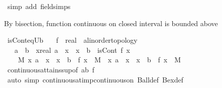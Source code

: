 \begin{isabellebody}
\ {\isacharparenleft}{\kern0pt}simp\ add{\isacharcolon}{\kern0pt}\ field{\isacharunderscore}{\kern0pt}simps{\isacharparenright}{\kern0pt}%
\endisatagproof
{\isafoldproof}%
%
\isadelimproof
%
\endisadelimproof
%
\isadelimdocument
%
\endisadelimdocument
%
\isatagdocument
%
\isamarkuptrue%
%
\endisatagdocument
{\isafolddocument}%
%
\isadelimdocument
%
\endisadelimdocument
%
\begin{isamarkuptext}%
By bisection, function continuous on closed interval is bounded above%
\end{isamarkuptext}\isamarkuptrue%
\isamarkupfalse%
\ isCont{\isacharunderscore}{\kern0pt}eq{\isacharunderscore}{\kern0pt}Ub{\isacharcolon}{\kern0pt}\isanewline
\ \ \ f\ {\isacharcolon}{\kern0pt}{\isacharcolon}{\kern0pt}\ {\isachardoublequoteopen}real\ {\isasymRightarrow}\ {\isacharprime}{\kern0pt}a{\isacharcolon}{\kern0pt}{\isacharcolon}{\kern0pt}linorder{\isacharunderscore}{\kern0pt}topology{\isachardoublequoteclose}\isanewline
\ \ \ {\isachardoublequoteopen}a\ {\isasymle}\ b\ {\isasymLongrightarrow}\ {\isasymforall}x{\isacharcolon}{\kern0pt}{\isacharcolon}{\kern0pt}real{\isachardot}{\kern0pt}\ a\ {\isasymle}\ x\ {\isasymand}\ x\ {\isasymle}\ b\ {\isasymlongrightarrow}\ isCont\ f\ x\ {\isasymLongrightarrow}\isanewline
\ \ \ \ {\isasymexists}M{\isachardot}{\kern0pt}\ {\isacharparenleft}{\kern0pt}{\isasymforall}x{\isachardot}{\kern0pt}\ a\ {\isasymle}\ x\ {\isasymand}\ x\ {\isasymle}\ b\ {\isasymlongrightarrow}\ f\ x\ {\isasymle}\ M{\isacharparenright}{\kern0pt}\ {\isasymand}\ {\isacharparenleft}{\kern0pt}{\isasymexists}x{\isachardot}{\kern0pt}\ a\ {\isasymle}\ x\ {\isasymand}\ x\ {\isasymle}\ b\ {\isasymand}\ f\ x\ {\isacharequal}{\kern0pt}\ M{\isacharparenright}{\kern0pt}{\isachardoublequoteclose}\isanewline
%
\isadelimproof
\ \ %
\endisadelimproof
%
\isatagproof
{}\isamarkupfalse%
\ continuous{\isacharunderscore}{\kern0pt}attains{\isacharunderscore}{\kern0pt}sup{\isacharbrackleft}{\kern0pt}of\ {\isachardoublequoteopen}{\isacharbraceleft}{\kern0pt}a{\isachardot}{\kern0pt}{\isachardot}{\kern0pt}b{\isacharbraceright}{\kern0pt}{\isachardoublequoteclose}\ f{\isacharbrackright}{\kern0pt}\isanewline
\ \ \isamarkupfalse%
\ {\isacharparenleft}{\kern0pt}auto\ simp{\isacharcolon}{\kern0pt}\ continuous{\isacharunderscore}{\kern0pt}at{\isacharunderscore}{\kern0pt}imp{\isacharunderscore}{\kern0pt}continuous{\isacharunderscore}{\kern0pt}on\ Ball{\isacharunderscore}{\kern0pt}def\ Bex{\isacharunderscore}{\kern0pt}def{\isacharparenright}{\kern0pt}%

\end{isabellebody}

